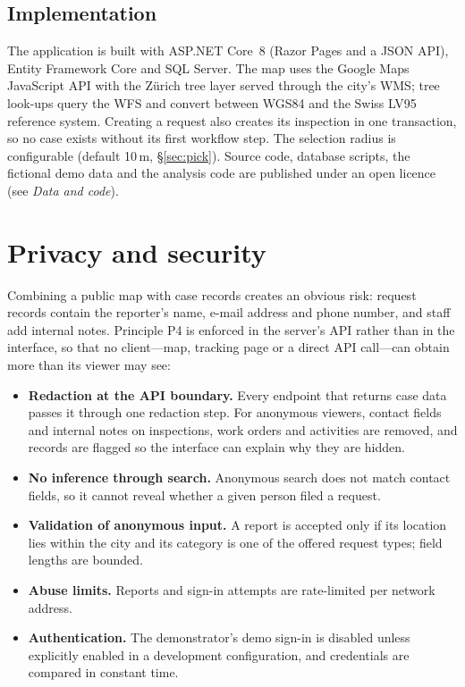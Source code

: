 \documentclass[11pt,a4paper]{article}
\begin{document}
\subsection{Implementation}

The application is built with ASP.NET Core~8 (Razor Pages and a JSON API), Entity Framework Core and SQL Server. The map uses the Google Maps JavaScript API with the Zürich tree layer served through the city's WMS; tree look-ups query the WFS and convert between WGS84 and the Swiss LV95 reference system. Creating a request also creates its inspection in one transaction, so no case exists without its first workflow step. The selection radius is configurable (default 10\,m, \S\ref{sec:pick}). Source code, database scripts, the fictional demo data and the analysis code are published under an open licence (see \emph{Data and code}).

\section{Privacy and security}
\label{sec:privacy}

Combining a public map with case records creates an obvious risk: request records contain the reporter's name, e-mail address and phone number, and staff add internal notes. Principle P4 is enforced in the server's API rather than in the interface, so that no client---map, tracking page or a direct API call---can obtain more than its viewer may see:

\begin{itemize}
  \item \textbf{Redaction at the API boundary.} Every endpoint that returns case data passes it through one redaction step. For anonymous viewers, contact fields and internal notes on inspections, work orders and activities are removed, and records are flagged so the interface can explain why they are hidden.
  \item \textbf{No inference through search.} Anonymous search does not match contact fields, so it cannot reveal whether a given person filed a request.
  \item \textbf{Validation of anonymous input.} A report is accepted only if its location lies within the city and its category is one of the offered request types; field lengths are bounded.
  \item \textbf{Abuse limits.} Reports and sign-in attempts are rate-limited per network address.
  \item \textbf{Authentication.} The demonstrator's demo sign-in is disabled unless explicitly enabled in a development configuration, and credentials are compared in constant time.
\end{itemize}
\end{document}
